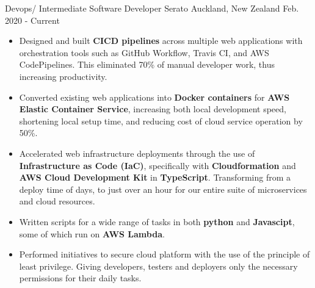 

\begin{cventries}

  \cventry
    {Devops/ Intermediate Software Developer} %
    {Serato} %
    {Auckland, New Zealand} %
    {Feb. 2020 - Current} %
    {\renewcommand{\labelitemii}{\bullet}
      \begin{cvitems} %
        \item[] {
            \begin{itemize}[leftmargin=14pt,topsep=5pt] %
                \itemsep0.3em
                \item {Designed and built \textbf{CICD pipelines} across multiple web applications with orchestration tools such as GitHub Workflow, Travis CI, and AWS CodePipelines. This eliminated 70\% of manual developer work, thus increasing productivity.}
                \item {Converted existing web applications into \textbf{Docker containers} for \textbf{AWS Elastic Container Service}, increasing both local development speed, shortening local setup time, and reducing cost of cloud service operation by 50\%.}
                \item {Accelerated web infrastructure deployments through the use of \textbf{Infrastructure as Code (IaC)}, specifically with \textbf{Cloudformation} and \textbf{AWS Cloud Development Kit} in \textbf{TypeScript}. Transforming from a deploy time of days, to just over an hour for our entire suite of microservices and cloud resources. }
                \item {Written scripts for a wide range of tasks in both \textbf{python} and \textbf{Javascipt}, some of which run on \textbf{AWS Lambda}.}
                \item {Performed initiatives to secure cloud platform with the use of the principle of least privilege. Giving developers, testers and deployers only the necessary permissions for their daily tasks.}

\end{itemize}}
\end{cvitems}}
\end{cventries}
